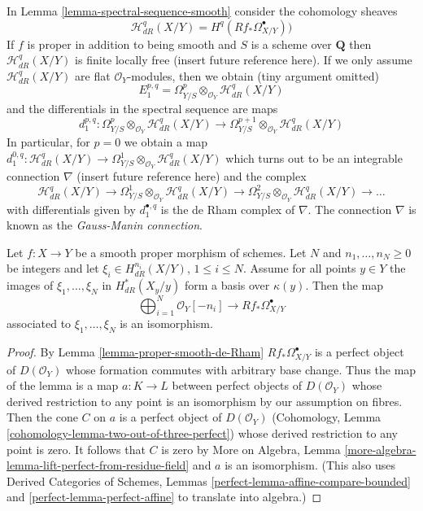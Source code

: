 \begin{remark}
\label{remark-gauss-manin}
In Lemma \ref{lemma-spectral-sequence-smooth} consider the cohomology sheaves
$$
\mathcal{H}^q_{dR}(X/Y) = H^q(Rf_*\Omega^\bullet_{X/Y}))
$$
If $f$ is proper in addition to being smooth and $S$ is a scheme over
$\mathbf{Q}$ then $\mathcal{H}^q_{dR}(X/Y)$ is finite locally free (insert
future reference here). If we only assume $\mathcal{H}^q_{dR}(X/Y)$
are flat $\mathcal{O}_Y$-modules, then we obtain (tiny argument omitted)
$$
E_1^{p, q} =
\Omega^p_{Y/S} \otimes_{\mathcal{O}_Y} \mathcal{H}^q_{dR}(X/Y)
$$
and the differentials in the spectral sequence are maps
$$
d_1^{p, q} :
\Omega^p_{Y/S} \otimes_{\mathcal{O}_Y} \mathcal{H}^q_{dR}(X/Y)
\longrightarrow
\Omega^{p + 1}_{Y/S} \otimes_{\mathcal{O}_Y} \mathcal{H}^q_{dR}(X/Y)
$$
In particular, for $p = 0$ we obtain a map
$d_1^{0, q} : \mathcal{H}^q_{dR}(X/Y) \to
\Omega^1_{Y/S} \otimes_{\mathcal{O}_Y} \mathcal{H}^q_{dR}(X/Y)$
which turns out to be an integrable connection
$\nabla$ (insert future reference here)
and the complex
$$
\mathcal{H}^q_{dR}(X/Y) \to
\Omega^1_{Y/S} \otimes_{\mathcal{O}_Y} \mathcal{H}^q_{dR}(X/Y) \to
\Omega^2_{Y/S} \otimes_{\mathcal{O}_Y} \mathcal{H}^q_{dR}(X/Y) \to \ldots
$$
with differentials given by $d_1^{\bullet, q}$
is the de Rham complex of $\nabla$.
The connection $\nabla$ is known as the {\it Gauss-Manin connection}.
\end{remark}

\begin{lemma}
\label{lemma-relative-global-generation-on-fibres}
Let $f : X \to Y$ be a smooth proper morphism of schemes.
Let $N$ and $n_1, \ldots, n_N \geq 0$ be integers and let
$\xi_i \in H^{n_i}_{dR}(X/Y)$, $1 \leq i \leq N$.
Assume for all points $y \in Y$ the images of $\xi_1, \ldots, \xi_N$
in $H^*_{dR}(X_y/y)$ form a basis over $\kappa(y)$. Then the map
$$
\bigoplus\nolimits_{i = 1}^N \mathcal{O}_Y[-n_i]
\longrightarrow
Rf_*\Omega^\bullet_{X/Y}
$$
associated to $\xi_1, \ldots, \xi_N$ is an isomorphism.
\end{lemma}

\begin{proof}
By Lemma \ref{lemma-proper-smooth-de-Rham}
$Rf_*\Omega^\bullet_{X/Y}$ is a perfect object of $D(\mathcal{O}_Y)$
whose formation commutes with arbitrary base change.
Thus the map of the lemma is a map $a : K \to L$
between perfect objects of $D(\mathcal{O}_Y)$
whose derived restriction to any point is an isomorphism
by our assumption on fibres. Then the cone $C$ on $a$ is a perfect
object of $D(\mathcal{O}_Y)$ (Cohomology, Lemma
\ref{cohomology-lemma-two-out-of-three-perfect}) whose
derived restriction to any point is zero. It follows that $C$
is zero by More on Algebra, Lemma
\ref{more-algebra-lemma-lift-perfect-from-residue-field}
and $a$ is an isomorphism. (This also uses Derived Categories of Schemes,
Lemmas \ref{perfect-lemma-affine-compare-bounded} and
\ref{perfect-lemma-perfect-affine} to translate into algebra.)
\end{proof}

